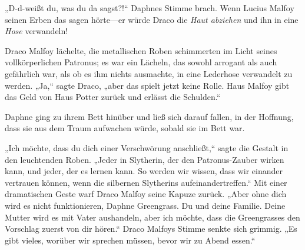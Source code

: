 „D-d-weißt du, was du da sagst?!“ Daphnes Stimme brach.
Wenn Lucius Malfoy seinen Erben das sagen hörte—er würde Draco die \emph{Haut abziehen} und ihn in eine \emph{Hose} verwandeln!

Draco Malfoy lächelte, die metallischen Roben schimmerten im Licht seines vollkörperlichen Patronus; es war ein Lächeln, das sowohl arrogant als auch gefährlich war, als ob es ihm nichts ausmachte, in eine Lederhose verwandelt zu werden.
„Ja,“ sagte Draco, „aber das spielt jetzt keine Rolle. Haus Malfoy gibt das Geld von Haus Potter zurück und erlässt die Schulden.“

Daphne ging zu ihrem Bett hinüber und ließ sich darauf fallen, in der Hoffnung, dass sie aus dem Traum aufwachen würde, sobald sie im Bett war.

„Ich möchte, dass du dich einer Verschwörung anschließt,“ sagte die Gestalt in den leuchtenden Roben. „Jeder in Slytherin, der den Patronus-Zauber wirken kann, und jeder, der es lernen kann. So werden wir wissen, dass wir einander vertrauen können, wenn die silbernen Slytherins aufeinandertreffen.“
Mit einer dramatischen Geste warf Draco Malfoy seine Kapuze zurück.
„Aber ohne dich wird es nicht funktionieren, Daphne Greengrass. Du und deine Familie. Deine Mutter wird es mit Vater aushandeln, aber ich möchte, dass die Greengrasses den Vorschlag zuerst von dir hören.“
Draco Malfoys Stimme senkte sich grimmig.
„Es gibt vieles, worüber wir sprechen müssen, bevor wir zu Abend essen.“

